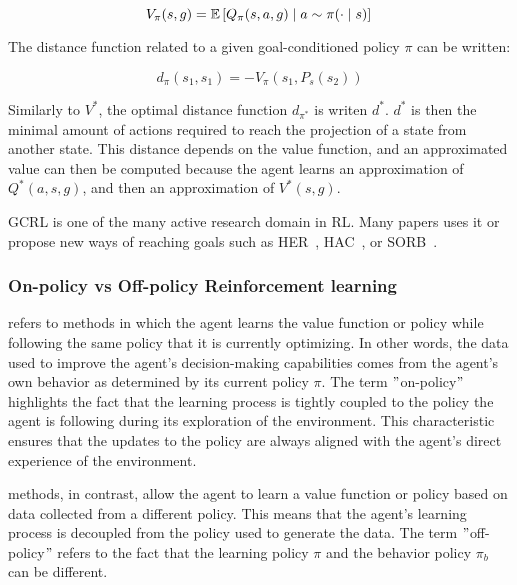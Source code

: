 \begin{equation} \label{eq:bg:rl:uvfa}
    V_\pi(s, g) = \mathbb{E} \left[ Q_\pi(s, a, g) \mid a \sim \pi(\cdot \mid s) \right] \\
\end{equation}

The distance function related to a given goal-conditioned policy $\pi$ can be written:

\begin{equation} \label{eq:bg:rl:uvfa-distance}
    d_\pi(s_1, s_1) = - V_\pi(s_1, P_s(s_2))
\end{equation}

Similarly to $V^*$, the optimal distance function $d_{\pi^*}$ is writen $d^*$.
$d^*$ is then the minimal amount of actions required to reach the projection of a state from another state.
This distance depends on the value function, and an approximated value can then be computed because the agent learns an
approximation of $Q^*(a, s, g)$, and then an approximation of $V^*(s, g)$.

GCRL is one of the many active research domain in RL.
Many papers uses it or propose new ways of reaching goals such as HER~\citep{andrychowicz2017hindsight},
HAC~\cite{levy2019learning}, or SORB~\cite{eysenbach2019search}.


\subsubsection{On-policy vs Off-policy Reinforcement learning}\label{subsection:bg:rl:on-off-policy}

 refers to methods in which the agent learns the value function or policy while
following the same policy that it is currently optimizing.
In other words, the data used to improve the agent's decision-making capabilities comes from the agent’s own behavior
as determined by its current policy $\pi$.
The term \("\)on-policy\("\) highlights the fact that the learning process is tightly coupled to the policy the agent is
following during its exploration of the environment.
This characteristic ensures that the updates to the policy are always aligned with the agent's direct experience of the
environment.

 methods, in contrast, allow the agent to learn a value function or policy based on
data collected from a different policy.
This means that the agent's learning process is decoupled from the policy used to generate the data.
The term \("\)off-policy\("\) refers to the fact that the learning policy $\pi$ and the behavior policy $\pi_b$ can be
different.

